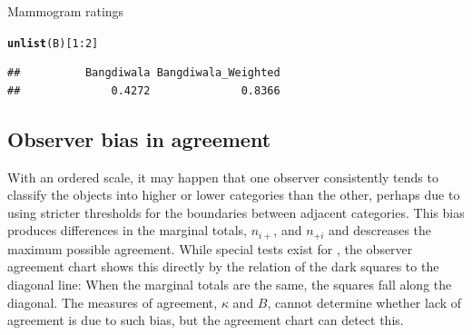 \documentclass[11pt]{book}\usepackage[]{graphicx}\usepackage[]{color}
\makeatletter
\newcommand{\hlnum}[1]{\textcolor[rgb]{0.686,0.059,0.569}{#1}}%
\newcommand{\hlopt}[1]{\textcolor[rgb]{0,0,0}{#1}}%
\newcommand{\hlstd}[1]{\textcolor[rgb]{0.345,0.345,0.345}{#1}}%
\newcommand{\hlkwd}[1]{\textcolor[rgb]{0.737,0.353,0.396}{\textbf{#1}}}%
\newenvironment{kframe}{%
 \def\at@end@of@kframe{}%
 \ifinner\ifhmode%
  \def\at@end@of@kframe{\end{minipage}}%
  \begin{minipage}{\columnwidth}%
 \fi\fi%
 \def\FrameCommand##1{\hskip\@totalleftmargin \hskip-\fboxsep
 \colorbox{shadecolor}{##1}\hskip-\fboxsep
     \hskip-\linewidth \hskip-\@totalleftmargin \hskip\columnwidth}%
 \MakeFramed {\advance\hsize-\width
   \@totalleftmargin\z@ \linewidth\hsize
   \@setminipage}}%
 {\par\unskip\endMakeFramed%
 \at@end@of@kframe}
\newenvironment{knitrout}{}{} %
\renewenvironment{knitrout}{\small\renewcommand{\baselinestretch}{.85}}{} %
\makeatother
\begin{document}
\begin{Example}[mammograms]{Mammogram ratings}
\begin{knitrout}
\color{fgcolor}\begin{kframe}
\begin{alltt}
\hlkwd{unlist}\hlstd{(B)[}\hlnum{1}\hlopt{:}\hlnum{2}\hlstd{]}
\end{alltt}
\begin{verbatim}
##          Bangdiwala Bangdiwala_Weighted 
##              0.4272              0.8366
\end{verbatim}
\end{kframe}
\end{knitrout}



\end{Example}
\subsection{Observer bias in agreement}\label{sec:twoway-observer}

With an ordered scale, it may happen that one observer consistently
tends to classify the objects into higher or lower categories than
the other, perhaps due to using stricter thresholds for the
boundaries between adjacent categories.
This bias produces differences in the marginal totals,
\(n_{i+}\), and \(n_{+i}\) and descreases the maximum possible agreement.  
While special tests exist for
, the observer agreement chart shows this
directly by the relation of the dark squares to the diagonal line:
When the marginal totals are the same, the squares fall along the
diagonal.
The measures of agreement, $\kappa$ and $B$, cannot determine
whether lack of agreement is due to such bias, but the agreement chart can
detect this.
\end{document}
